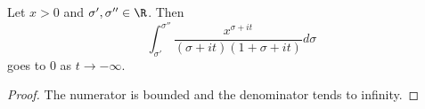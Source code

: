 \begin{lemma}
\label{tendsto_zero_Lower}
\leanok
Let $x>0$ and $\sigma',\sigma''\in\R$. Then
  $$\int_{\sigma'}^{\sigma''}\frac{x^{\sigma+it}}{(\sigma+it)(1+\sigma + it)}d\sigma$$
  goes to $0$ as $t\to-\infty$.
\end{lemma}
\begin{proof}
\leanok
The numerator is bounded and the denominator tends to infinity.
\end{proof}
